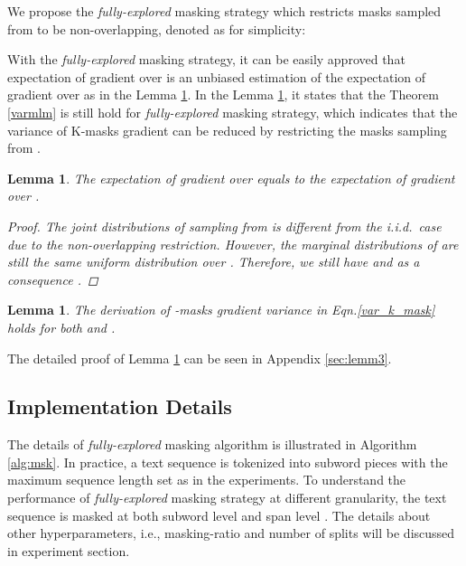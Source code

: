 \documentclass{article} \usepackage{iclr2021_conference,times}
\theoremstyle{plain}
\newtheorem{lemma}[theorem]{Lemma}
\begin{document}
We propose the \emph{fully-explored} masking strategy which restricts masks sampled from  to be non-overlapping, denoted as  for simplicity: 

With the \emph{fully-explored} masking strategy, it can be easily approved that expectation of gradient over  is an unbiased estimation of the expectation of gradient over  as in the Lemma \ref{no_bias_lemma}.  In the Lemma \ref{variance_lemma}, it states that the Theorem \ref{varmlm} is still hold for \emph{fully-explored} masking strategy, which indicates that the variance of K-masks gradient can be reduced by restricting the masks sampling from .
\begin{lemma}
\label{no_bias_lemma}
The expectation of gradient over  equals to the expectation of gradient over .
\begin{proof}
The joint distributions of  sampling from  is different from the i.i.d.\ case due to the non-overlapping restriction. However, the marginal distributions of  are still the same uniform distribution over .
Therefore, we still have  and as a consequence . 
\end{proof}
\end{lemma}
\begin{lemma}
\label{variance_lemma}
The derivation of -masks gradient variance in Eqn.\ref{var_k_mask} holds for both  and .
\end{lemma}
The detailed proof of Lemma \ref{variance_lemma} can be seen in Appendix \ref{sec:lemm3}.



\vspace{-2mm}
\subsection{Implementation Details}
\vspace{-2mm}
The details of \emph{fully-explored} masking algorithm is illustrated in Algorithm \ref{alg:msk}. In practice, a text sequence  is tokenized into subword pieces \citep{devlin2018bert} with the maximum sequence length  set as  in the experiments. To understand the performance of \emph{fully-explored} masking strategy at different granularity, the text sequence  is masked at both subword level \citep{devlin2018bert,liu2019roberta} and span level \citep{joshi2019spanbert,wang2019structbert}. The details about other hyperparameters, i.e., masking-ratio and number of splits  will be discussed in experiment section.      
 
\end{document}
